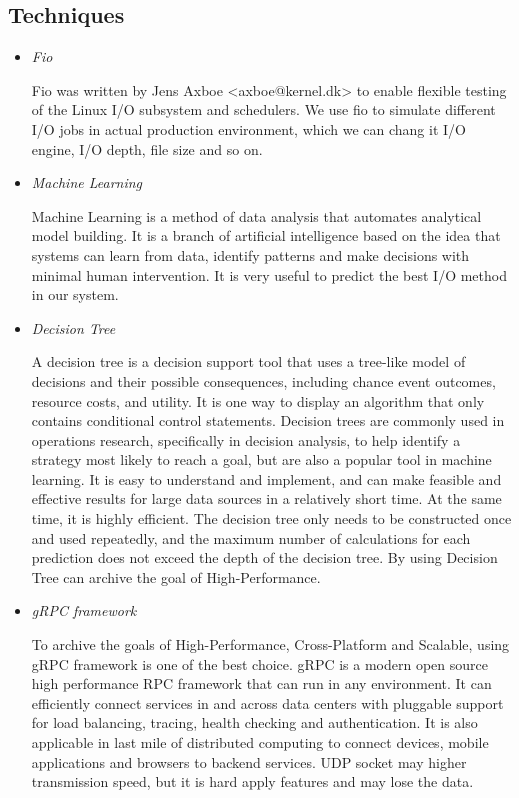 \documentclass[conference]{IEEEtran}
\begin{document}
\subsection{Techniques}

\begin{itemize}

	\item \emph{Fio}

	      Fio was written by Jens Axboe <axboe@kernel.dk> to enable flexible testing of
	      the Linux I/O subsystem and schedulers. We use fio to simulate different I/O jobs in actual production environment, which we can chang it I/O engine, I/O depth, file size and so on.

	\item \emph{Machine Learning}

	      Machine Learning is a method of data analysis that automates analytical model building.
	      It is a branch of artificial intelligence based on the idea that systems can learn from data, identify patterns and make decisions with minimal human intervention.
	      It is very useful to predict the best I/O method in our system.

	\item \emph{Decision Tree}

	      A decision tree is a decision support tool that uses a tree-like model of decisions and their possible consequences, including chance event outcomes, resource costs, and utility. It is one way to display an algorithm that only contains conditional control statements.
	      Decision trees are commonly used in operations research, specifically in decision analysis, to help identify a strategy most likely to reach a goal, but are also a popular tool in machine learning.
	      It is easy to understand and implement, and can make feasible and effective results for large data sources in a relatively short time. At the same time, it is highly efficient. The decision tree only needs to be constructed once and used repeatedly,
	      and the maximum number of calculations for each prediction does not exceed the depth of the decision tree. By using Decision Tree can archive the goal of High-Performance.

	\item \emph{gRPC framework}

	      To archive the goals of High-Performance, Cross-Platform and Scalable, using gRPC framework is one of the best choice.
	      gRPC is a modern open source high performance RPC framework that can run in any environment. It can efficiently connect services in
	      and across data centers with pluggable support for load balancing, tracing, health checking and authentication.
	      It is also applicable in last mile of distributed computing to connect devices, mobile applications and browsers to backend services.
	      UDP socket may higher transmission speed, but it is hard apply features and may lose the data.


\end{itemize}
\end{document}
